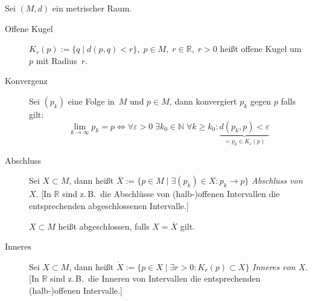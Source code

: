 Sei $(M,d)$ ein metrischer Raum.
\begin{description}
    \item[Offene Kugel] $K_r(p) := \{ q \mid d(p,q)<r \},\; p \in M,\; r \in \mathbb R, \; r>0$ heißt offene Kugel um~$p$ mit Radius~$r$.
    \item[Konvergenz] Sei $(p_k)$ eine Folge in~$M$ und $p \in M$, dann konvergiert $p_k$ gegen $p$ falls gilt:
    \[
    \lim_{k \to \infty} p_k = p
    \iff
    \forall \varepsilon>0
    \;\exists k_0 \in \mathbb N
    \;\forall k \geq k_0
    :
    \underbrace{d(p_k, p) < \varepsilon}_{= p_k \in K_\varepsilon(p)}
    \]
    \item[Abschluss] Sei $X \subset M$, dann heißt $\overline X := \{ p \in M \mid \exists (p_k) \in X : p_k \to p \}$ \emph{Abschluss von $X$}.
    [In $\mathbb R$ sind z.\,B.~die Abschlüsse von (halb-)offenen Intervallen die entsprechenden abgeschlossenen Intervalle.]
    
    $X \subset M$ heißt abgeschlossen, falls $X = \overline X$ gilt.
    \item[Inneres] Sei $X \subset M$, dann heißt $\mathring X := \{ p \in X \mid \exists r>0 : K_r(p) \subset X \}$ \emph{Inneres von $X$}.
    [In $\mathbb R$ sind z.\,B.~die Inneren von Intervallen die entsprechenden (halb-)offenen Intervalle.]
    

\end{description}
